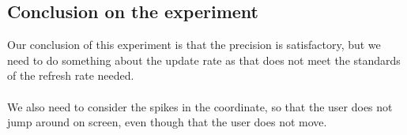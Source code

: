 \subsection{Conclusion on the experiment}
Our conclusion of this experiment is that the precision is satisfactory, but we need to do something about the update rate as that does not meet the standards of the refresh rate needed.
\\\\
We also need to consider the spikes in the coordinate, so that the user does not jump around on screen, even though that the user does not move.
